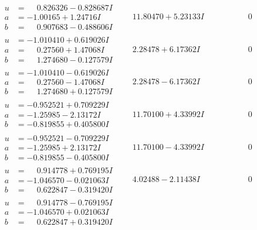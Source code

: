 \documentclass[1p]{elsarticle_modified}
\theoremstyle{definition}
\begin{document}
$$\begin{array}{c|c|c}
\begin{aligned}
u &= \phantom{-}0.826326 - 0.828687 I \\
a &= -1.00165 + 1.24716 I \\
b &= \phantom{-}0.907683 - 0.488606 I\end{aligned}
 & \phantom{-}11.80470 + 5.23133 I & \phantom{-0.000000 } 0 \\ \hline\begin{aligned}
u &= -1.010410 + 0.619026 I \\
a &= \phantom{-}0.27560 + 1.47068 I \\
b &= \phantom{-}1.274680 - 0.127579 I\end{aligned}
 & \phantom{-}2.28478 + 6.17362 I & \phantom{-0.000000 } 0 \\ \hline\begin{aligned}
u &= -1.010410 - 0.619026 I \\
a &= \phantom{-}0.27560 - 1.47068 I \\
b &= \phantom{-}1.274680 + 0.127579 I\end{aligned}
 & \phantom{-}2.28478 - 6.17362 I & \phantom{-0.000000 } 0 \\ \hline\begin{aligned}
u &= -0.952521 + 0.709229 I \\
a &= -1.25985 - 2.13172 I \\
b &= -0.819855 + 0.405800 I\end{aligned}
 & \phantom{-}11.70100 + 4.33992 I & \phantom{-0.000000 } 0 \\ \hline\begin{aligned}
u &= -0.952521 - 0.709229 I \\
a &= -1.25985 + 2.13172 I \\
b &= -0.819855 - 0.405800 I\end{aligned}
 & \phantom{-}11.70100 - 4.33992 I & \phantom{-0.000000 } 0 \\ \hline\begin{aligned}
u &= \phantom{-}0.914778 + 0.769195 I \\
a &= -1.046570 - 0.021063 I \\
b &= \phantom{-}0.622847 - 0.319420 I\end{aligned}
 & \phantom{-}4.02488 - 2.11438 I & \phantom{-0.000000 } 0 \\ \hline\begin{aligned}
u &= \phantom{-}0.914778 - 0.769195 I \\
a &= -1.046570 + 0.021063 I \\
b &= \phantom{-}0.622847 + 0.319420 I\end{aligned}

\end{array}$$
\end{document}
